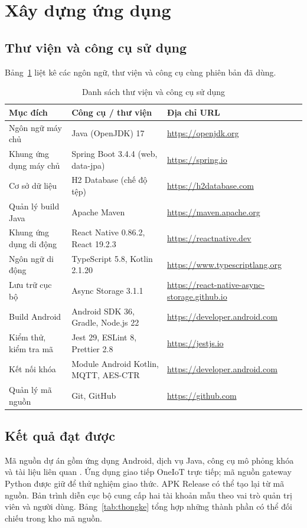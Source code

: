 \documentclass[../DoAn.tex]{subfiles}
\begin{document}
\section{Xây dựng ứng dụng}
\subsection{Thư viện và công cụ sử dụng}
Bảng~\ref{table:congcu} liệt kê các ngôn ngữ, thư viện và công cụ cùng phiên bản đã dùng.

\begin{table}[H]
\centering\small
\renewcommand{\arraystretch}{1.1}
\caption{Danh sách thư viện và công cụ sử dụng}
\label{table:congcu}
\begin{tabularx}{\textwidth}{|p{4.3cm}|p{4.6cm}|X|}
\hline
\textbf{Mục đích} & \textbf{Công cụ / thư viện} & \textbf{Địa chỉ URL} \\ \hline
Ngôn ngữ máy chủ & Java (OpenJDK) 17 & \url{https://openjdk.org} \\ \hline
Khung ứng dụng máy chủ & Spring Boot 3.4.4 (web, data-jpa) & \url{https://spring.io} \\ \hline
Cơ sở dữ liệu & H2 Database (chế độ tệp) & \url{https://h2database.com} \\ \hline
Quản lý build Java & Apache Maven & \url{https://maven.apache.org} \\ \hline
Khung ứng dụng di động & React Native 0.86.2, React 19.2.3 & \url{https://reactnative.dev} \\ \hline
Ngôn ngữ di động & TypeScript 5.8, Kotlin 2.1.20 & \url{https://www.typescriptlang.org} \\ \hline
Lưu trữ cục bộ & Async Storage 3.1.1 & \url{https://react-native-async-storage.github.io} \\ \hline
Build Android & Android SDK 36, Gradle, Node.js 22 & \url{https://developer.android.com} \\ \hline
Kiểm thử, kiểm tra mã & Jest 29, ESLint 8, Prettier 2.8 & \url{https://jestjs.io} \\ \hline
Kết nối khóa & Module Android Kotlin, MQTT, AES-CTR & \url{https://developer.android.com} \\ \hline
Quản lý mã nguồn & Git, GitHub & \url{https://github.com} \\ \hline
\end{tabularx}
\end{table}

\subsection{Kết quả đạt được}
Mã nguồn dự án gồm ứng dụng Android, dịch vụ Java, công cụ mô phỏng khóa và tài liệu liên quan \cite{roomhubrepo}. Ứng dụng giao tiếp OneIoT trực tiếp; mã nguồn gateway Python được giữ để thử nghiệm giao thức. APK Release có thể tạo lại từ mã nguồn. Bản trình diễn cục bộ cung cấp hai tài khoản mẫu theo vai trò quản trị viên và người dùng. Bảng~\ref{tab:thongke} tổng hợp những thành phần có thể đối chiếu trong kho mã nguồn.
\end{document}
